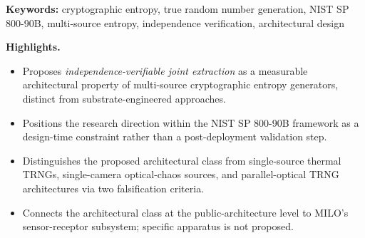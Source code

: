 \begin{abstract}
\noindent True random number generators that seed cryptographic systems are
evaluated on two properties: the entropy density of the physical noise
being sampled and the \emph{independence} of the samples produced. NIST
SP 800-90B specifies that a multi-source entropy generator may combine
multiple noise sources only when the sources are \emph{independent} ---
that is, when the joint distribution of source outputs is the product of
the marginals. In current practice, independence is achieved by
substrate engineering: chaotic laser arrays and microcomb-based parallel
chaos sources are \emph{designed} to be independent at the optical
substrate, and the independence claim is supported by inter-channel
cross-correlation measurements at the device level. This paper argues
that the next architectural direction for multi-source entropy
generation in critical-infrastructure cryptography is to \emph{design
for verifiable independence at the joint-observation level} --- to build
entropy architectures in which the independence of sampled noise is a
measurable architectural property rather than an assumed substrate
property. The position is framed as a research direction, not a specific
implementation: this paper argues \emph{that} the architectural problem
is worth pursuing, not \emph{which} apparatus solves it. The argument is
positioned within the NIST SP 800-90B framework, distinguished from
existing single-source thermal, single-camera optical-chaos, and
parallel-optical TRNG architectures, and connected at the architectural
level to MILO's sensor-receptor subsystem.
\end{abstract}

\noindent\textbf{Keywords:} cryptographic entropy, true random number generation,
NIST SP 800-90B, multi-source entropy, independence verification,
architectural design\par

\textbf{Highlights.}

\begin{itemize}
\tightlist
\item
  Proposes \emph{independence-verifiable joint extraction} as a
  measurable architectural property of multi-source cryptographic
  entropy generators, distinct from substrate-engineered approaches.
\item
  Positions the research direction within the NIST SP 800-90B framework
  as a design-time constraint rather than a post-deployment validation
  step.
\item
  Distinguishes the proposed architectural class from single-source
  thermal TRNGs, single-camera optical-chaos sources, and
  parallel-optical TRNG architectures via two falsification criteria.
\item
  Connects the architectural class at the public-architecture level to
  MILO's sensor-receptor subsystem; specific apparatus is not proposed.
\end{itemize}

